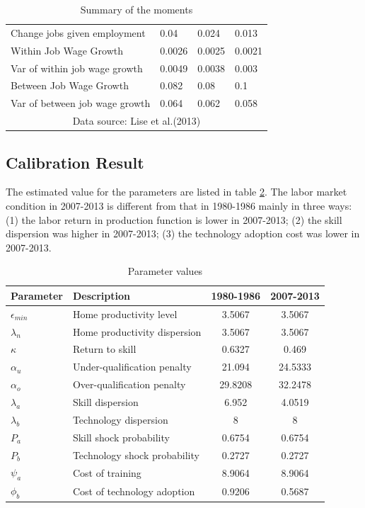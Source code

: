 \documentclass[12pt]{article}
\newcommand{\1}{\mathbb{1}}
\begin{document}
\begin{table}[h!]
\begin{tabular}{l|lll}
Change jobs given employment   & 0.04                  & 0.024       & 0.013   \\
Within Job Wage Growth        & 0.0026                & 0.0025      & 0.0021  \\
Var of within job wage growth & 0.0049                & 0.0038      & 0.003   \\
Between Job Wage Growth      & 0.082                 & 0.08        & 0.1     \\
Var of between job wage growth & 0.064                 & 0.062       & 0.058   \\
\hline 
\multicolumn{4}{c}{\small Data source: Lise et al.(2013)\cite{Liseetal2013}} \\
\end{tabular}
\caption{Summary of the moments}
\label{Summary_moment}
\end{table}

\subsection{Calibration Result}
The estimated value for the parameters are listed in table \ref{Parameter}. The labor market condition in 2007-2013 is different from that in 1980-1986 mainly in three ways: (1) the labor return in production function is lower in 2007-2013; (2) the skill dispersion was higher in 2007-2013; (3) the technology adoption cost was lower in 2007-2013. 

\begin{table}[h!]
\centering
\begin{tabular}{ll|cc}
\hline \hline
Parameter     &       Description         & 1980-1986     & 2007-2013                \\
\hline 
$\epsilon_{min}$& Home productivity level & 3.5067  & 3.5067 \\
$\lambda_n$& Home productivity dispersion & 3.5067  & 3.5067 \\
$\kappa$ & Return to skill & 0.6327  & 0.469    \\
$\alpha_u$ & Under-qualification penalty & 21.094  & 24.5333 \\
$\alpha_o$ & Over-qualification penalty & 29.8208 & 32.2478 \\
$\lambda_a$ & Skill dispersion & 6.952   & 4.0519   \\
$\lambda_b$ & Technology dispersion & 8       & 8       \\
$P_a$ & Skill shock probability & 0.6754  & 0.6754   \\
$P_b$ & Technology shock probability & 0.2727  & 0.2727   \\
$\psi_a$ & Cost of training & 8.9064  & 8.9064   \\
$\phi_b$ & Cost of technology adoption & 0.9206  & 0.5687  \\
\hline 
\end{tabular}
\caption{Parameter values}
\label{Parameter}
\end{table}
\end{document}
